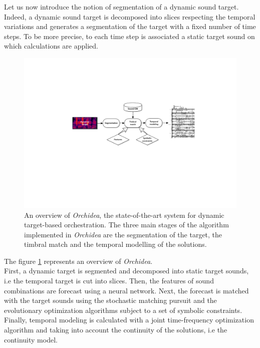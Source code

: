 \documentclass[a4paper]{book}
\begin{document}
Let us now introduce the notion of segmentation of a dynamic sound target. Indeed, a dynamic sound target is decomposed into slices respecting the temporal variations and generates a segmentation of the target with a fixed number of time steps. To be more precise, to each time step is associated a static target sound on which calculations are applied.


\begin{figure}[ht!]
\centering
\includegraphics[scale=0.6]{Orchidea_overview.pdf}
\caption{An overview of \textit{Orchidea}, the state-of-the-art system for dynamic target-based orchestration. The three main stages of the algorithm implemented in \textit{Orchidea} are the segmentation of the target, the timbral match and the temporal modelling of the solutions.}
\label{fig:orchidea_overview}
\end{figure}

The figure \ref{fig:orchidea_overview} represents an overview of \textit{Orchidea}.\\
First, a dynamic target is segmented and decomposed into static target sounds, i.e the temporal target is cut into slices. Then, the features of sound combinations are forecast using a neural network. Next, the forecast is matched with the target sounds using the stochastic matching pursuit and the evolutionary optimization algorithms subject to a set of symbolic constraints. Finally, temporal modeling is calculated with a joint time-frequency optimization algorithm and taking into account the continuity of the solutions, i.e the continuity model. \\
\end{document}
